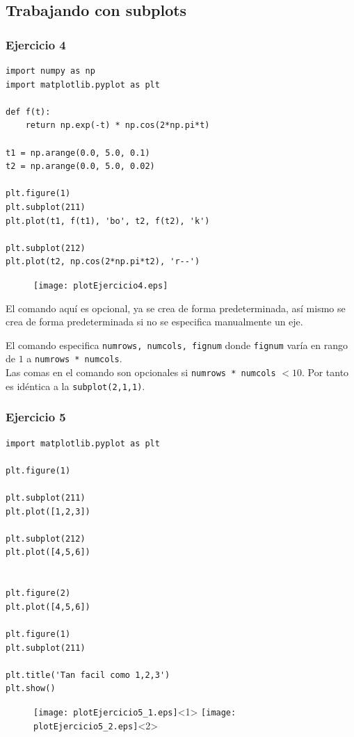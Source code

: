 \subsection{Trabajando con subplots}
\begin{frame}
\frametitle{Ejercicio 4}
\begin{lstlisting}[caption=Trabajando con múltiples gráficas,basicstyle=\linespread{1.2}\ttfamily\small, columns=fullflexible]
import numpy as np
import matplotlib.pyplot as plt

def f(t):
    return np.exp(-t) * np.cos(2*np.pi*t)

t1 = np.arange(0.0, 5.0, 0.1)
t2 = np.arange(0.0, 5.0, 0.02)

plt.figure(1)
plt.subplot(211)
plt.plot(t1, f(t1), 'bo', t2, f(t2), 'k')

plt.subplot(212)
plt.plot(t2, np.cos(2*np.pi*t2), 'r--')
\end{lstlisting}
\end{frame}
\begin{frame}[fragile]
\begin{figure}
	\centering
	\texttt{[image: plotEjercicio4.eps]}
\end{figure}
\end{frame}
\begin{frame}
El comando  aquí es opcional, ya  se crea de forma predeterminada, así mismo  se crea de forma predeterminada si no se especifica manualmente un eje.
\end{frame}
\begin{frame}
El comando  especifica \texttt{numrows, numcols, fignum} donde \texttt{fignum} varía en rango de $1$ a \texttt{numrows * numcols}.
\\
\bigskip
Las comas en el comando  son opcionales si \texttt{numrows * numcols} $<10$. Por tanto  es idéntica a la \texttt{subplot(2,1,1)}.
\end{frame}
\begin{frame}
\frametitle{Ejercicio 5}
\begin{lstlisting}[caption=Ejemplo con subplots, basicstyle=\linespread{1.2}\ttfamily\small, columns=fullflexible]
import matplotlib.pyplot as plt

plt.figure(1)                

plt.subplot(211)        
plt.plot([1,2,3])

plt.subplot(212)         
plt.plot([4,5,6])


plt.figure(2)                
plt.plot([4,5,6])           

plt.figure(1)                
plt.subplot(211)         

plt.title('Tan facil como 1,2,3')
plt.show()
\end{lstlisting}
\end{frame}
\begin{frame}[fragile]
\begin{figure}
	\centering
	\texttt{[image: plotEjercicio5\_1.eps]}<1>
	\texttt{[image: plotEjercicio5\_2.eps]}<2>
\end{figure}
\end{frame}
